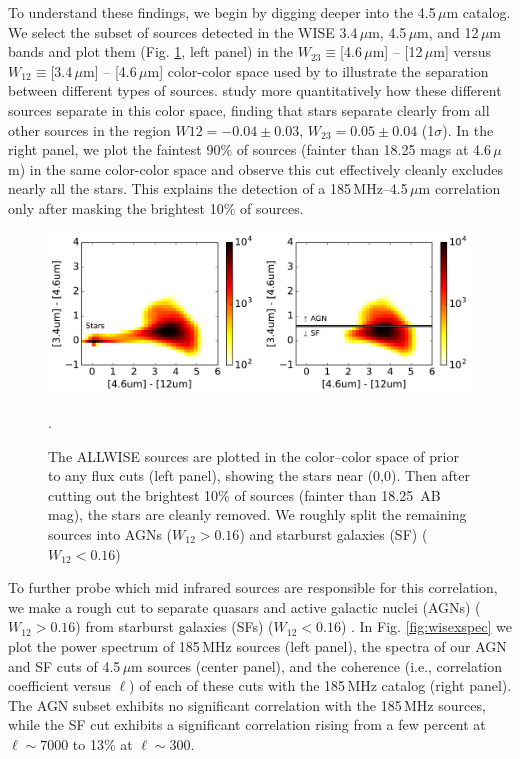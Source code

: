 \documentclass{emulateapj}
\begin{document}
To understand these findings, we begin by digging deeper into the 4.5\,$\mu$m catalog. We select the subset of sources detected in the WISE 3.4\,$\mu$m, 4.5\,$\mu$m, and 12\,$\mu$m bands and plot them (Fig. \ref{fig:wisecolorcolor}, left panel) in the $W_{23}\equiv$[4.6\,$\mu$m] -- [12\,$\mu$m] versus $W_{12}\equiv$[3.4\,$\mu$m] -- [4.6\,$\mu$m] color-color space used by \citet{Wright2010} to illustrate the separation between different types of sources. \citet{nikutta14} study more quantitatively how these different sources separate in this color space, finding that stars separate clearly from all other sources in the region $W{12}=-0.04\pm0.03$, $W_{23}=0.05\pm0.04$ (1$\sigma$). In the right panel, we plot the faintest 90\% of sources (fainter than 18.25 mags at 4.6\,$\mu$m) in the same color-color space and observe this cut effectively cleanly excludes nearly all the stars. This explains the detection of a 185\,MHz--4.5\,$\mu$m correlation only after masking the brightest 10\% of sources. 

\begin{figure}[h]
\centering
\includegraphics[width=6in]{images/wise_color_color_figure_max=1e-3_5Jy.pdf}
\caption{The ALLWISE sources are plotted in the color--color space of \citet{Wright2010} prior to any flux cuts (left panel), showing the stars near (0,0). Then after cutting out the brightest 10\% of sources (fainter than 18.25\, AB mag), the stars are cleanly removed. We roughly split the remaining sources into AGNs ($W_{12}>0.16$) and starburst galaxies (SF) ($W_{12}<0.16$) \citep{nikutta14,kurcz16}}.
\label{fig:wisecolorcolor}
\end{figure}

To further probe which mid infrared sources are responsible for this correlation, we make a rough cut to separate quasars and active galactic nuclei (AGNs) ($W_{12}>0.16$) from starburst galaxies (SFs) ($W_{12}<0.16$) \citep{nikutta14,kurcz16}. In Fig. \ref{fig:wisexspec} we plot the power spectrum of 185\,MHz sources (left panel), the spectra of our AGN and SF cuts of 4.5\,$\mu$m sources (center panel), and the coherence (i.e., correlation coefficient versus $\ell$) of each of these cuts with the 185\,MHz catalog (right panel). The AGN subset exhibits no significant correlation with the 185\,MHz sources, while the SF cut exhibits a significant correlation rising from a few percent at $\ell\sim7000$ to 13\% at $\ell\sim300$. 
\end{document}
